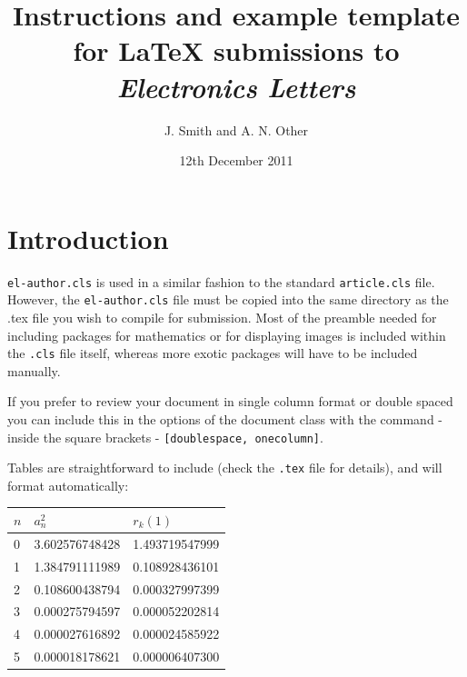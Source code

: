 \documentclass[twocolumn]{el-author}
\date{12th December 2011}
\begin{document}
\title{Instructions and example template for \LaTeX{} submissions to \emph{Electronics Letters}}

\author{J. Smith and A. N. Other}


\maketitle

\section{Introduction}

\verb"el-author.cls" is used in a similar fashion to the standard \verb"article.cls" file. However, the \verb"el-author.cls" file must be copied into the same directory as the .tex file you wish to compile for submission. Most of the preamble needed for including packages for mathematics or for displaying images is included within the \verb".cls" file itself, whereas more exotic packages will have to be included manually.

If you prefer to review your document in single column format or double spaced you can include this in the options of the document class with the command - inside the square brackets - \verb"[doublespace, onecolumn]".

Tables are straightforward to include (check the \verb".tex" file for details), and will format automatically:
\begin{table}[h]
{\begin{tabular}{|l|l|l|}\hline
$n$ & $a_{n}^{2}$ & $r_{k}(1)$\\\hline
0 & 3.602576748428 & 1.493719547999\\\hline
1 & 1.384791111989 & 0.108928436101\\\hline
2 & 0.108600438794 & 0.000327997399\\\hline
3 & 0.000275794597 & 0.000052202814\\\hline
4 & 0.000027616892 & 0.000024585922\\\hline
5 & 0.000018178621 & 0.000006407300\\\hline
\end{tabular}}{}
\end{table}
\end{document}
